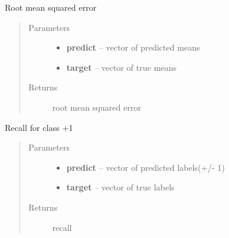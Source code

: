 \documentclass[letterpaper,10pt,english]{sphinxmanual}
\begin{document}

\begin{fulllineitems}
\label{pyGPs.Validation:pyGPs.Validation.valid.RMSE}
Root mean squared error
\begin{quote}\begin{description}
\item[{Parameters}] \leavevmode\begin{itemize}
\item {} 
\textbf{predict} -- vector of predicted means

\item {} 
\textbf{target} -- vector of true means

\end{itemize}

\item[{Returns}] \leavevmode
root mean squared error

\end{description}\end{quote}

\end{fulllineitems}


\begin{fulllineitems}
\label{pyGPs.Validation:pyGPs.Validation.valid.Recall}
Recall for class +1
\begin{quote}\begin{description}
\item[{Parameters}] \leavevmode\begin{itemize}
\item {} 
\textbf{predict} -- vector of predicted labels(+/- 1)

\item {} 
\textbf{target} -- vector of true labels

\end{itemize}

\item[{Returns}] \leavevmode
recall

\end{description}\end{quote}

\end{fulllineitems}
\end{document}
